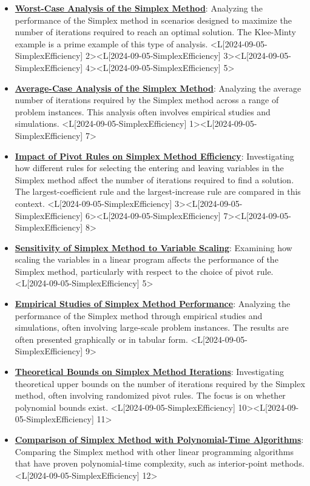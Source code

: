 \documentclass{article}%
\begin{document}
\begin{itemize}[[leftmargin=*]]%
\item \href{https://www.math.purdue.edu/~yipn/421/2024-09-05-SimplexEfficiency.pdf#page=2}{\textbf{Worst{-}Case Analysis of the Simplex Method}}: Analyzing the performance of the Simplex method in scenarios designed to maximize the number of iterations required to reach an optimal solution. The Klee-Minty example is a prime example of this type of analysis. <L[2024-09-05-SimplexEfficiency] 2><L[2024-09-05-SimplexEfficiency] 3><L[2024-09-05-SimplexEfficiency] 4><L[2024-09-05-SimplexEfficiency] 5>%
\item \href{https://www.math.purdue.edu/~yipn/421/2024-09-05-SimplexEfficiency.pdf#page=1}{\textbf{Average{-}Case Analysis of the Simplex Method}}: Analyzing the average number of iterations required by the Simplex method across a range of problem instances. This analysis often involves empirical studies and simulations. <L[2024-09-05-SimplexEfficiency] 1><L[2024-09-05-SimplexEfficiency] 7>%
\item \href{https://www.math.purdue.edu/~yipn/421/2024-09-05-SimplexEfficiency.pdf#page=3}{\textbf{Impact of Pivot Rules on Simplex Method Efficiency}}: Investigating how different rules for selecting the entering and leaving variables in the Simplex method affect the number of iterations required to find a solution. The largest-coefficient rule and the largest-increase rule are compared in this context. <L[2024-09-05-SimplexEfficiency] 3><L[2024-09-05-SimplexEfficiency] 6><L[2024-09-05-SimplexEfficiency] 7><L[2024-09-05-SimplexEfficiency] 8>%
\item \href{https://www.math.purdue.edu/~yipn/421/2024-09-05-SimplexEfficiency.pdf#page=5}{\textbf{Sensitivity of Simplex Method to Variable Scaling}}: Examining how scaling the variables in a linear program affects the performance of the Simplex method, particularly with respect to the choice of pivot rule. <L[2024-09-05-SimplexEfficiency] 5>%
\item \href{https://www.math.purdue.edu/~yipn/421/2024-09-05-SimplexEfficiency.pdf#page=9}{\textbf{Empirical Studies of Simplex Method Performance}}: Analyzing the performance of the Simplex method through empirical studies and simulations, often involving large-scale problem instances. The results are often presented graphically or in tabular form. <L[2024-09-05-SimplexEfficiency] 9>%
\item \href{https://www.math.purdue.edu/~yipn/421/2024-09-05-SimplexEfficiency.pdf#page=10}{\textbf{Theoretical Bounds on Simplex Method Iterations}}: Investigating theoretical upper bounds on the number of iterations required by the Simplex method, often involving randomized pivot rules. The focus is on whether polynomial bounds exist. <L[2024-09-05-SimplexEfficiency] 10><L[2024-09-05-SimplexEfficiency] 11>%
\item \href{https://www.math.purdue.edu/~yipn/421/2024-09-05-SimplexEfficiency.pdf#page=12}{\textbf{Comparison of Simplex Method with Polynomial{-}Time Algorithms}}: Comparing the Simplex method with other linear programming algorithms that have proven polynomial-time complexity, such as interior-point methods. <L[2024-09-05-SimplexEfficiency] 12>%
\end{itemize}%
\end{document}
